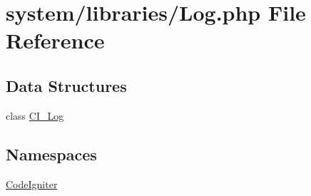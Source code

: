 \hypertarget{_log_8php}{\section{system/libraries/\-Log.php File Reference}
\label{_log_8php}
}
\subsection*{Data Structures}
\begin{DoxyCompactItemize}
\item 
class \hyperlink{class_c_i___log}{C\-I\-\_\-\-Log}
\end{DoxyCompactItemize}
\subsection*{Namespaces}
\begin{DoxyCompactItemize}
\item 
\hyperlink{namespace_code_igniter}{Code\-Igniter}
\end{DoxyCompactItemize}
